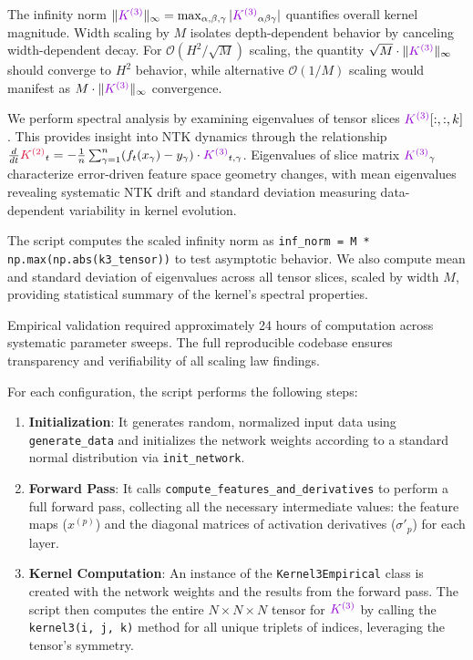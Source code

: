 \documentclass[a4paper]{article}
\theoremstyle{plain}
\theoremstyle{definition}
\theoremstyle{remark}
\begin{document}
The infinity norm $\|\textcolor{k3color}{K^{(3)}}\|_\infty = \max_{\alpha, \beta, \gamma} |\textcolor{k3color}{K^{(3)}}_{\alpha\beta\gamma}|$ quantifies overall kernel magnitude. Width scaling by $M$ isolates depth-dependent behavior by canceling width-dependent decay. For $\mathcal{O}(H^2/\sqrt{M})$ scaling, the quantity $\sqrt{M} \cdot \|\textcolor{k3color}{K^{(3)}}\|_\infty$ should converge to $H^2$ behavior, while alternative $\mathcal{O}(1/M)$ scaling would manifest as $M \cdot \|\textcolor{k3color}{K^{(3)}}\|_\infty$ convergence.

We perform spectral analysis by examining eigenvalues of tensor slices $\textcolor{k3color}{K^{(3)}}[:, :, k]$. This provides insight into NTK dynamics through the relationship $\frac{d}{dt} \textcolor{kernelcolor}{K^{(2)}}_t = -\frac{1}{n} \sum_{\gamma=1}^n (f_t(x_\gamma) - y_\gamma) \cdot \textcolor{k3color}{K^{(3)}}_{t, \gamma}$. Eigenvalues of slice matrix $\textcolor{k3color}{K^{(3)}}_\gamma$ characterize error-driven feature space geometry changes, with mean eigenvalues revealing systematic NTK drift and standard deviation measuring data-dependent variability in kernel evolution.

The script computes the scaled infinity norm as \texttt{inf\_norm = M * np.max(np.abs(k3\_tensor))} to test asymptotic behavior. We also compute mean and standard deviation of eigenvalues across all tensor slices, scaled by width $M$, providing statistical summary of the kernel's spectral properties.

Empirical validation required approximately 24 hours of computation across systematic parameter sweeps. The full reproducible codebase ensures transparency and verifiability of all scaling law findings.


For each configuration, the script performs the following steps:
\begin{enumerate}
    \item \textbf{Initialization}: It generates random, normalized input data using \texttt{generate\_data} and initializes the network weights according to a standard normal distribution via \texttt{init\_network}.
    \item \textbf{Forward Pass}: It calls \texttt{compute\_features\_and\_derivatives} to perform a full forward pass, collecting all the necessary intermediate values: the feature maps ($x^{(p)}$) and the diagonal matrices of activation derivatives ($\sigma'_p$) for each layer.
    \item \textbf{Kernel Computation}: An instance of the \texttt{Kernel3Empirical} class is created with the network weights and the results from the forward pass. The script then computes the entire $N \times N \times N$ tensor for $\textcolor{k3color}{K^{(3)}}$ by calling the \texttt{kernel3(i, j, k)} method for all unique triplets of indices, leveraging the tensor's symmetry.
\end{enumerate}
\end{document}
